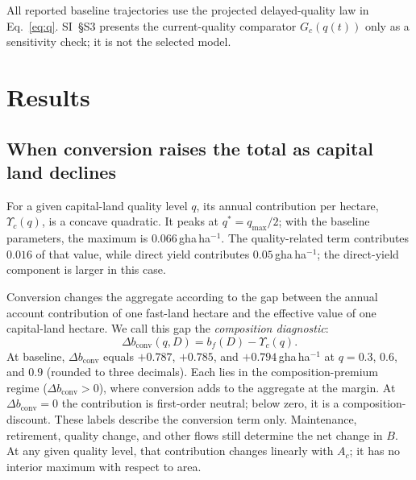 \documentclass[preprint,12pt,authoryear]{elsarticle}
\newcommand{\dconv}{\Delta b_{\mathrm{conv}}}
\newcommand{\Ups}{\Upsilon_c}
\begin{document}
All reported baseline trajectories use the projected delayed-quality law in Eq.~\eqref{eq:q}. SI~\S S3 presents the current-quality comparator $G_c(q(t))$ only as a sensitivity check; it is not the selected model.
\section{Results}\label{sec:results}

\subsection{When conversion raises the total as capital land declines}\label{sec:mask}

For a given capital-land quality level $q$, its annual contribution per hectare, $\Ups(q)$, is a concave quadratic. It peaks at $q^*=q_{\max}/2$; with the baseline parameters, the maximum is $0.066$\,gha\,ha$^{-1}$. The quality-related term contributes $0.016$ of that value, while direct yield contributes $0.05$\,gha\,ha$^{-1}$; the direct-yield component is larger in this case.

Conversion changes the aggregate according to the gap between the annual account contribution of one fast-land hectare and the effective value of one capital-land hectare. We call this gap the \emph{composition diagnostic}:
\begin{equation}\label{eq:dconv}
\dconv(q,D)=b_f(D)-\Ups(q).
\end{equation}
At baseline, $\dconv$ equals $+0.787$, $+0.785$, and $+0.794$\,gha\,ha$^{-1}$ at $q=0.3$, $0.6$, and $0.9$ (rounded to three decimals). Each lies in the composition-premium regime ($\dconv>0$), where conversion adds to the aggregate at the margin. At $\dconv=0$ the contribution is first-order neutral; below zero, it is a composition-discount. These labels describe the conversion term only. Maintenance, retirement, quality change, and other flows still determine the net change in $B$. At any given quality level, that contribution changes linearly with $A_c$; it has no interior maximum with respect to area.
\end{document}
